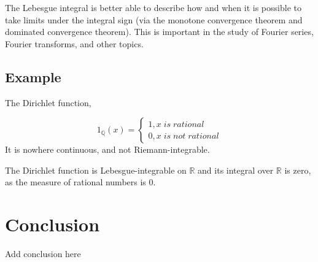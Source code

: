 \documentclass{article}
\begin{document}
The Lebesgue integral is better able to describe how and when it is possible to take limits under the integral sign (via the monotone convergence theorem and dominated convergence theorem). This is important in the study of Fourier series, Fourier transforms, and other topics. 


\subsection{Example}
The Dirichlet function,

\[ 1_{\mathbb{Q}}(x)=\begin{cases} 
    1 , x \;is\; rational \\
    0 , x \;is\; not\; rational
   \end{cases}
\]
 It is nowhere continuous, and not Riemann-integrable.\medskip
 
 The Dirichlet function is Lebesgue-integrable on $\mathbb{R}$ and its integral over $\mathbb{R}$ is zero, as the measure of rational numbers is 0.



\newpage
\section{Conclusion}
	Add conclusion here
\newpage
\end{document}
